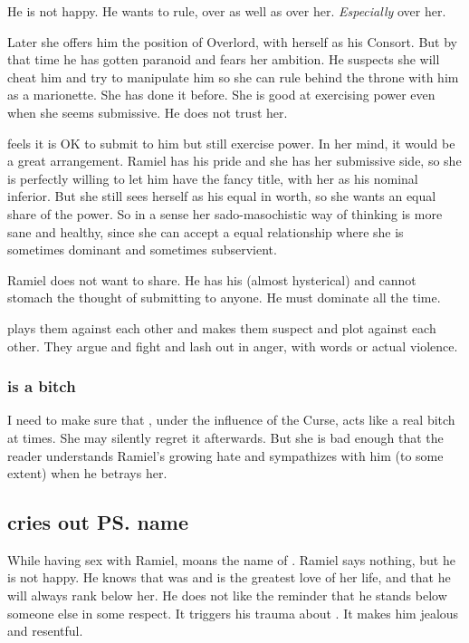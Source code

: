 He is not happy. 
He wants to rule, over \Mystraacht{} as well as over her. 
\emph{Especially} over her. 

Later she offers him the position of Overlord, with herself as his Consort. 
But by that time he has gotten paranoid and fears her ambition. 
He suspects she will cheat him and try to manipulate him so she can rule behind the throne with him as a marionette. 
She has done it before. 
She is good at exercising power even when she seems submissive. 
He does not trust her. 

\Shiaraid{} feels it is OK to submit to him but still exercise power. 
In her mind, it would be a great arrangement. 
Ramiel has his pride and she has her submissive side, so she is perfectly willing to let him have the fancy title, with her as his nominal inferior. 
But she still sees herself as his equal in worth, so she wants an equal share of the power. 
So in a sense her sado-masochistic way of thinking is more sane and healthy, since she can accept a equal relationship where she is sometimes dominant and sometimes subservient. 

Ramiel does not want to share. 
He has his (almost hysterical)  and cannot stomach the thought of submitting to anyone. 
He must dominate all the time. 

 plays them against each other and makes them suspect and plot against each other. 
They argue and fight and lash out in anger, with words or actual violence. 





\subsubsection{\Belzir{} is a bitch}
I need to make sure that \Belzir, under the influence of the Curse, acts like a real bitch at times. 
She may silently regret it afterwards. 
But she is bad enough that the reader understands Ramiel's growing hate and sympathizes with him (to some extent) when he betrays her. 









\subsection{\Belzir cries out \ps{\Aryal} name}
While having sex with Ramiel, \Belzir{} moans the name of \Aryal. 
Ramiel says nothing, but he is not happy. 
He knows that \Aryal{} was and is the greatest love of her life, and that he will always rank below her.
He does not like the reminder that he stands below someone else in some respect. 
It triggers his trauma about . 
It makes him jealous and resentful. 

